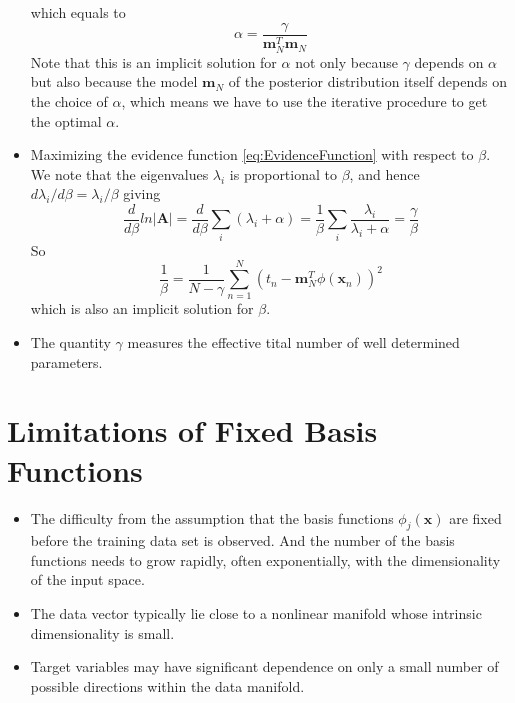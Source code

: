 \documentclass[12pt, a4paper]{article}
\begin{document}
\begin{itemize}
        which equals to
        \begin{equation}
            \alpha=\frac{\gamma}{\bm{m}_N^T\bm{m}_N}
        \end{equation}
        Note that this is an implicit solution for $\alpha$ not only because $\gamma$ depends on $\alpha$
        but also because the model $\bm{m}_N$ of the posterior distribution itself depends on the choice of
        $\alpha$, which means we have to use the iterative procedure to get the optimal $\alpha$.
        \item Maximizing the evidence function \ref{eq:EvidenceFunction} with respect to $\beta$. We note 
        that the eigenvalues $\lambda_i$ is proportional to $\beta$, and hence $d\lambda_i/d\beta=\lambda_i/
        \beta$ giving
        \begin{equation}
            \frac{d}{d\beta}ln\vert\bm{A}\vert=\frac{d}{d\beta}\sum_i(\lambda_i+\alpha)=\frac{1}{\beta}
            \sum_i\frac{\lambda_i}{\lambda_i+\alpha}=\frac{\gamma}{\beta}
        \end{equation}
        So
        \begin{equation}
            \frac{1}{\beta}=\frac{1}{N-\gamma}\sum_{n=1}^{N}(t_n-\bm{m}_N^T\phi(\bm{x}_n))^2
        \end{equation}
        which is also an implicit solution for $\beta$.
        \item The quantity $\gamma$ measures the effective tital number of well determined parameters.
    \end{itemize}
    \section{Limitations of Fixed Basis Functions}
    \begin{itemize}
        \item The difficulty from the assumption that the basis functions $\phi_j(\bm{x})$ are fixed before 
        the training data set is observed. And the number of the basis functions needs to grow rapidly, often
        exponentially, with the dimensionality of the input space.
        \item The data vector typically lie close to a nonlinear manifold whose intrinsic dimensionality is 
        small.
        \item Target variables may have significant dependence on only a small number of possible directions
        within the data manifold.
    \end{itemize}
\end{document}
